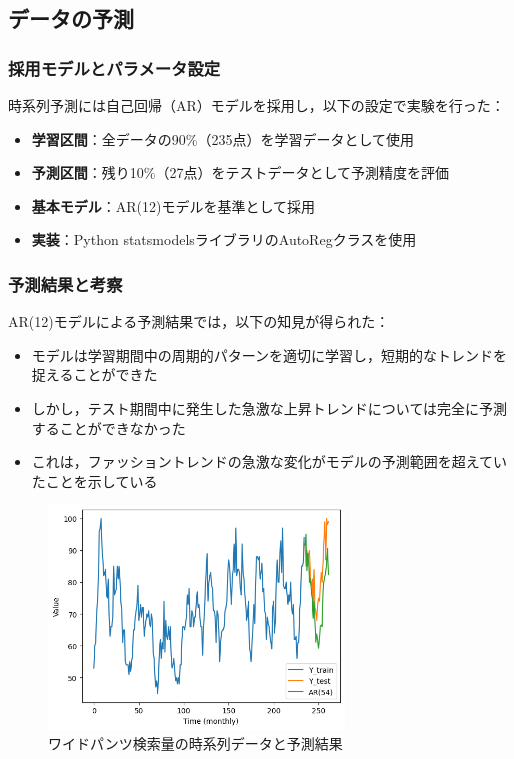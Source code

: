 \documentclass[12pt]{article}
\begin{document}
\subsection{データの予測}

\subsubsection{採用モデルとパラメータ設定}
時系列予測には自己回帰（AR）モデルを採用し，以下の設定で実験を行った：

\begin{itemize}
\item \textbf{学習区間}：全データの90\%（235点）を学習データとして使用
\item \textbf{予測区間}：残り10\%（27点）をテストデータとして予測精度を評価
\item \textbf{基本モデル}：AR(12)モデルを基準として採用
\item \textbf{実装}：Python statsmodelsライブラリのAutoRegクラスを使用
\end{itemize}

\subsubsection{予測結果と考察}
AR(12)モデルによる予測結果では，以下の知見が得られた：

\begin{itemize}
\item モデルは学習期間中の周期的パターンを適切に学習し，短期的なトレンドを捉えることができた
\item しかし，テスト期間中に発生した急激な上昇トレンドについては完全に予測することができなかった
\item これは，ファッショントレンドの急激な変化がモデルの予測範囲を超えていたことを示している
\end{itemize}

\begin{figure}[htbp]
    \centering
    \includegraphics[width=0.7\textwidth]{./static/completed_image.png}
    \caption{ワイドパンツ検索量の時系列データと予測結果}
    \label{fig:prediction_result}
\end{figure}
\end{document}
